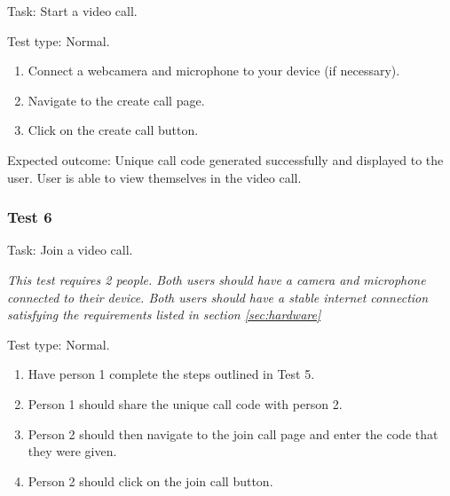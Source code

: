{\sffamily Task:} Start a video call.\\

{\color{gray} \hrulefill}

{\sffamily Test type: Normal.}\\

\begin{enumerate}
  \item Connect a webcamera and microphone to your device (if necessary).
  \item Navigate to the create call page.
  \item Click on the create call button.
\end{enumerate}

{\sffamily Expected outcome:} Unique call code generated successfully
and displayed to the user. User is able to view themselves in
the video call.\\

{\color{gray} \hrulefill}

\vspace{0.2cm}

\subsubsection{Test 6}

{\sffamily Task:} Join a video call.\\ \vspace{0.2cm}

\textit{This test requires 2 people. Both users should have a camera
and microphone connected to their device. Both users should have a
stable internet connection satisfying the requirements listed in section \ref{sec:hardware}}\\

{\color{gray} \hrulefill}

{\sffamily Test type: Normal.}\\

\begin{enumerate}
  \item Have person 1 complete the steps outlined in Test 5.
  \item Person 1 should share the unique call code with person 2.
  \item Person 2 should then navigate to the join call page and enter the code that they were given.
  \item Person 2 should click on the join call button.
\end{enumerate}

